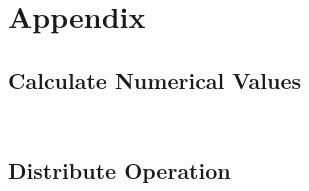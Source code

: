 \chapter{Appendix}
\label{sec:appendix}


\section{Calculate Numerical Values} \label{appendix:numericals}
    \inputminted[firstline=2031, lastline=2039]{js}{./../math-manipulator-code/src/functions/implementedOperators.ts}
    \inputminted[firstline=2839, lastline=2855]{js}{./../math-manipulator-code/src/functions/implementedOperators.ts}

\newpage
\section{Distribute Operation} \label{appendix:distribute}
    \inputminted[firstline=1254, lastline=1302]{js}{./../math-manipulator-code/src/functions/implementedOperators.ts}
    
